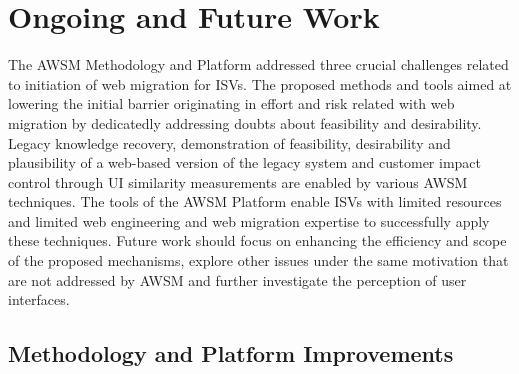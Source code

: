 \hypertarget{ongoing-and-future-work}{%
\section{Ongoing and Future Work}\label{ongoing-and-future-work}}

The AWSM Methodology and Platform addressed three crucial challenges related to initiation of web migration for ISVs.
The proposed methods and tools aimed at lowering the initial barrier originating in effort and risk related with web migration by dedicatedly addressing doubts about feasibility and desirability.
Legacy knowledge recovery, demonstration of feasibility, desirability and plausibility of a web-based version of the legacy system and customer impact control through UI similarity measurements are enabled by various AWSM techniques.
The tools of the AWSM Platform enable ISVs with limited resources and limited web engineering and web migration expertise to successfully apply these techniques.
Future work should focus on enhancing the efficiency and scope of the proposed mechanisms, explore other issues under the same motivation that are not addressed by AWSM and further investigate the perception of user interfaces.

\hypertarget{methodology-and-platform-improvements}{%
\subsection{Methodology and Platform Improvements}\label{methodology-and-platform-improvements}}

